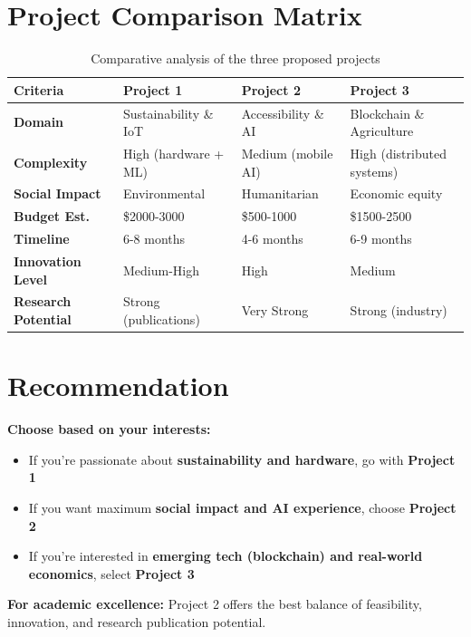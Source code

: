 \documentclass[12pt,a4paper]{article}
\begin{document}
\section{Project Comparison Matrix}

\begin{table}[h]
\centering
\begin{tabular}{|p{3cm}|p{3.5cm}|p{3.5cm}|p{3.5cm}|}
\hline
\textbf{Criteria} & \textbf{Project 1} & \textbf{Project 2} & \textbf{Project 3} \\
\hline
\textbf{Domain} & Sustainability \& IoT & Accessibility \& AI & Blockchain \& Agriculture \\
\hline
\textbf{Complexity} & High (hardware + ML) & Medium (mobile AI) & High (distributed systems) \\
\hline
\textbf{Social Impact} & Environmental & Humanitarian & Economic equity \\
\hline
\textbf{Budget Est.} & \$2000-3000 & \$500-1000 & \$1500-2500 \\
\hline
\textbf{Timeline} & 6-8 months & 4-6 months & 6-9 months \\
\hline
\textbf{Innovation Level} & Medium-High & High & Medium \\
\hline
\textbf{Research Potential} & Strong (publications) & Very Strong & Strong (industry) \\
\hline
\end{tabular}
\caption{Comparative analysis of the three proposed projects}
\end{table}

\section{Recommendation}

\textbf{Choose based on your interests:}
\begin{itemize}
    \item If you're passionate about \textbf{sustainability and hardware}, go with \textbf{Project 1}
    \item If you want maximum \textbf{social impact and AI experience}, choose \textbf{Project 2}
    \item If you're interested in \textbf{emerging tech (blockchain) and real-world economics}, select \textbf{Project 3}
\end{itemize}

\textbf{For academic excellence:} Project 2 offers the best balance of feasibility, innovation, and research publication potential.
\end{document}
